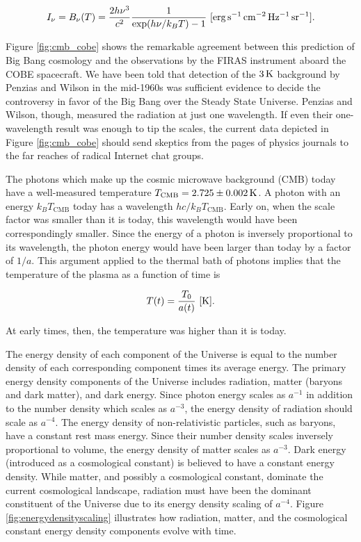 \documentclass[a4paper,11pt]{article}
\begin{document}
\begin{align*}
    I_\nu = B_\nu(T) = \frac{2h\nu^3}{c^2} \frac{1}{\exp({h\nu/k_BT}) - 1} ~ [{\rm erg\,s^{-1}\,cm^{-2}\,Hz^{-1}\,sr^{-1}}].
\end{align*}

{\noindent}Figure \ref{fig:cmb_cobe} shows the remarkable agreement between this prediction of Big Bang cosmology and the observations by the FIRAS instrument aboard the COBE spacecraft. We have been told that detection of the $3\,{\rm K}$ background by Penzias and Wilson in the mid-1960s was sufficient evidence to decide the controversy in favor of the Big Bang over the Steady State Universe. Penzias and Wilson, though, measured the radiation at just one wavelength. If even their one-wavelength result was enough to tip the scales, the current data depicted in Figure \ref{fig:cmb_cobe} should send skeptics from the pages of physics journals to the far reaches of radical Internet chat groups.

{\noindent}The photons which make up the cosmic microwave background (CMB) today have a well-measured temperature $T_\mathrm{CMB} = 2.725 \pm 0.002\,{\rm K}$. A photon with an energy $k_BT_\mathrm{CMB}$ today has a wavelength $hc/k_BT_\mathrm{CMB}$. Early on, when the scale factor was smaller than it is today, this wavelength would have been correspondingly smaller. Since the energy of a photon is inversely proportional to its wavelength, the photon energy would have been larger than today by a factor of $1/a$. This argument applied to the thermal bath of photons implies that the temperature of the plasma as a function of time is

\begin{align*}
    T(t) = \frac{T_0}{a(t)} ~ [{\rm K}].
\end{align*}

{\noindent}At early times, then, the temperature was higher than it is today.

{\noindent}The energy density of each component of the Universe is equal to the number density of each corresponding component times its average energy. The primary energy density components of the Universe includes radiation, matter (baryons and dark matter), and dark energy. Since photon energy scales as $a^{-1}$ in addition to the number density which scales as $a^{-3}$, the energy density of radiation should scale as $a^{-4}$. The energy density of non-relativistic particles, such as baryons, have a constant rest mass energy. Since their number density scales inversely proportional to volume, the energy density of matter scales as $a^{-3}$. Dark energy (introduced as a cosmological constant) is believed to have a constant energy density. While matter, and possibly a cosmological constant, dominate the current cosmological landscape, radiation must have been the dominant constituent of the Universe due to its energy density scaling of $a^{-4}$. Figure \ref{fig:energydensityscaling} illustrates how radiation, matter, and the cosmological constant energy density components evolve with time.
\end{document}
